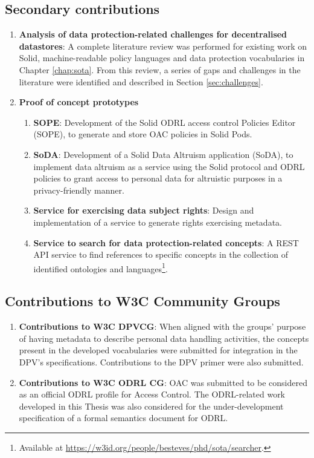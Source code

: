 \subsection{Secondary contributions}
\label{sec:contr_minor}

\begin{enumerate}
    \item [\textbf{C3.}] \textbf{Analysis of data protection-related challenges for decentralised datastores}: A complete literature review was performed for existing work on Solid, machine-readable policy languages and data protection vocabularies in Chapter \ref{chap:sota}. From this review, a series of gaps and challenges in the literature were identified and described in Section \ref{sec:challenges}.
    \item [\textbf{C4.}] \textbf{Proof of concept prototypes}
    \begin{enumerate}
        \item [\textbf{C4.1.}] \textbf{SOPE}: Development of the Solid ODRL access control Policies Editor (SOPE), to generate and store OAC policies in Solid Pods.
        \item [\textbf{C4.2.}] \textbf{SoDA}: Development of a Solid Data Altruism application (SoDA), to implement data altruism as a service using the Solid protocol and ODRL policies to grant access to personal data for altruistic purposes in a privacy-friendly manner.
        \item [\textbf{C4.3.}] \textbf{Service for exercising data subject rights}: Design and implementation of a service to generate rights exercising metadata.
        \item [\textbf{C4.4.}] \textbf{Service to search for data protection-related concepts}: A REST API service to find references to specific concepts in the collection of identified ontologies and languages\footnote{Available at \url{https://w3id.org/people/besteves/phd/sota/searcher}.}.
    \end{enumerate}
\end{enumerate}

\subsection{Contributions to W3C Community Groups}
\label{sec:contr_w3c}

\begin{enumerate}
    \item [\textbf{C5.}] \textbf{Contributions to W3C DPVCG}: When aligned with the groups' purpose of having metadata to describe personal data handling activities, the concepts present in the developed vocabularies were submitted for integration in the DPV's specifications. Contributions to the DPV primer were also submitted.
    \item [\textbf{C6.}] \textbf{Contributions to W3C ODRL CG}: OAC was submitted to be considered as an official ODRL profile for Access Control. The ODRL-related work developed in this Thesis was also considered for the under-development specification of a formal semantics document for ODRL.
\end{enumerate}